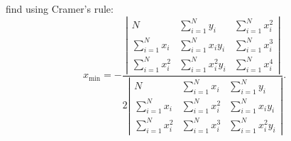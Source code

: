 find using Cramer's rule:
\[
x_{\text{min}}
=
-\frac{
\left|\begin{matrix}
           N       & \sum_{i=1}^N      y_i & \sum_{i=1}^N x_i^2 \\
\sum_{i=1}^N x_i   & \sum_{i=1}^N x_i  y_i & \sum_{i=1}^N x_i^3 \\
\sum_{i=1}^N x_i^2 & \sum_{i=1}^N x_i^2y_i & \sum_{i=1}^N x_i^4 
\end{matrix}\right|
}{
2\left|\begin{matrix}
           N       & \sum_{i=1}^N x_i   & \sum_{i=1}^N      y_i \\
\sum_{i=1}^N x_i   & \sum_{i=1}^N x_i^2 & \sum_{i=1}^N x_i  y_i \\
\sum_{i=1}^N x_i^2 & \sum_{i=1}^N x_i^3 & \sum_{i=1}^N x_i^2y_i 
\end{matrix}\right|
}.
\]






